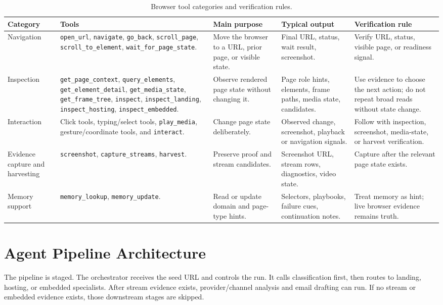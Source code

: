 \begin{table}[!htbp]
\centering
\begin{tabularx}{\textwidth}{Q{2.35cm} Y Y Y Y}
\toprule
{}
Category & Tools & Main purpose & Typical output & Verification rule \\
\midrule
Navigation & \texttt{open\_url}, \texttt{navigate}, \texttt{go\_back},
\texttt{scroll\_page}, \texttt{scroll\_to\_element},
\texttt{wait\_for\_page\_state}. & Move the browser to a URL, prior page, or
visible state. & Final URL, status, wait result, screenshot. & Verify URL,
status, visible page, or readiness signal. \\
Inspection & \texttt{get\_page\_context}, \texttt{query\_elements},
\texttt{get\_element\_detail}, \texttt{get\_media\_state},
\texttt{get\_frame\_tree}, \texttt{inspect}, \texttt{inspect\_landing},
\texttt{inspect\_hosting}, \texttt{inspect\_embedded}. & Observe rendered page
state without changing it. & Page role hints, elements, frame paths, media
state, candidates. & Use evidence to choose the next action; do not repeat
broad reads without state change. \\
Interaction & Click tools, typing/select tools, \texttt{play\_media},
gesture/coordinate tools, and \texttt{interact}. & Change page state
deliberately. & Observed change, screenshot, playback or navigation signals. &
Follow with inspection, screenshot, media-state, or harvest verification. \\
Evidence capture and harvesting & \texttt{screenshot},
\texttt{capture\_streams}, \texttt{harvest}. & Preserve proof and stream
candidates. & Screenshot URL, stream rows, diagnostics, video state. & Capture
after the relevant page state exists. \\
Memory support & \texttt{memory\_lookup}, \texttt{memory\_update}. & Read or
update domain and page-type hints. & Selectors, playbooks, failure cues,
continuation notes. & Treat memory as hint; live browser evidence remains
truth. \\
\bottomrule
\end{tabularx}
\caption{Browser tool categories and verification rules.}
\label{tab:browser-tool-categories}
\end{table}

\section{Agent Pipeline Architecture}

The pipeline is staged. The orchestrator receives the seed URL and controls the
run. It calls classification first, then routes to landing, hosting, or
embedded specialists. After stream evidence exists, provider/channel analysis
and email drafting can run. If no stream or embedded evidence exists, those
downstream stages are skipped.

